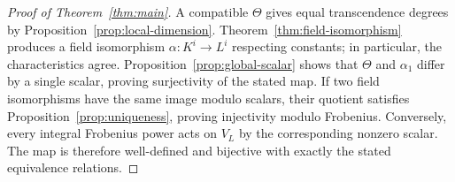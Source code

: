 \begin{proof}[Proof of Theorem~\ref{thm:main}]
A compatible $\Theta$ gives equal transcendence degrees by
Proposition~\ref{prop:local-dimension}. Theorem~\ref{thm:field-isomorphism}
produces a field isomorphism $\alpha:K^i\to L^i$ respecting constants;
in particular, the characteristics agree. Proposition~\ref{prop:global-scalar}
shows that $\Theta$ and $\alpha_1$ differ by a single scalar, proving
surjectivity of the stated map. If two field isomorphisms have the
same image modulo scalars, their quotient satisfies
Proposition~\ref{prop:uniqueness}, proving injectivity modulo Frobenius.
Conversely, every integral Frobenius power acts on $V_L$ by the
corresponding nonzero scalar. The map is therefore well-defined and
bijective with exactly the stated equivalence relations.
\end{proof}
